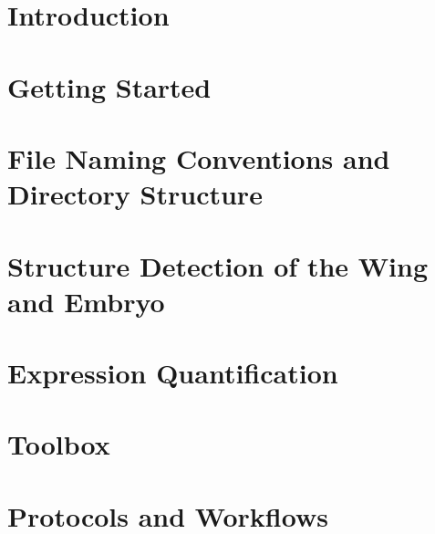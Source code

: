 \mainmatter
\setlength{\parindent}{0in}

\chapter{Introduction}


\chapter{Getting Started}\label{chap:getting_started}


\chapter{File Naming Conventions and Directory Structure}\label{chap:convention}


\chapter{Structure Detection of the \droso Wing and Embryo}\label{chap:structure}


\chapter{Expression Quantification}\label{chap:expression}


\chapter{\wingj \matlab Toolbox}\label{chap:matlab}


\chapter{Protocols and Workflows}\label{chap:protocols}


\renewcommand{\bibname}{References}

\renewcommand*{\bibfont}{\sffamily} %
\printbibliography[heading=myheading]

%
%
